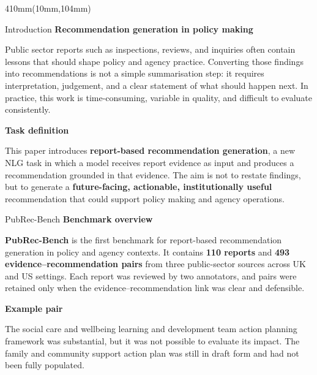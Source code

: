 \documentclass{article}
\newcommand{\SectionHeading}[1]{{\bfseries\fontsize{29}{33}\selectfont #1}\par\vspace{4mm}}
\newcommand{\BodyText}{\fontsize{24}{30}\selectfont\color{PosterText}}
\newcommand{\SmallBody}{\fontsize{21}{27}\selectfont\color{PosterText}}
\begin{document}
\begin{textblock*}{410mm}(10mm,104mm)
\begin{postersection}{Introduction}
\BodyText
\SectionHeading{Recommendation generation in policy making}
Public sector reports such as inspections, reviews, and inquiries often contain lessons that should shape policy and agency practice. Converting those findings into recommendations is not a simple summarisation step: it requires interpretation, judgement, and a clear statement of what should happen next. In practice, this work is time-consuming, variable in quality, and difficult to evaluate consistently.

\vspace{15mm}
\SectionHeading{Task definition}
This paper introduces \textbf{report-based recommendation generation}, a new NLG task in which a model receives report evidence as input and produces a recommendation grounded in that evidence. The aim is not to restate findings, but to generate a \textbf{future-facing, actionable, institutionally useful} recommendation that could support policy making and agency operations.

\vspace{6mm}
\begin{center}

\end{center}
\end{postersection}

\vspace{8mm}
\begin{postersection}{PubRec-Bench}
\BodyText
\SectionHeading{Benchmark overview}
\textbf{PubRec-Bench} is the first benchmark for report-based recommendation generation in policy and agency contexts. It contains \textbf{110 reports} and \textbf{493 evidence--recommendation pairs} from three public-sector sources across UK and US settings. Each report was reviewed by two annotators, and pairs were retained only when the evidence--recommendation link was clear and defensible.

\vspace{15mm}
\begin{minipage}[t]{0.50\linewidth}
\SectionHeading{Example pair}
\begin{tcolorbox}[colback=white,colframe=PosterHeader!20,arc=3mm,boxrule=0.8pt,left=3mm,right=3mm,top=2mm,bottom=2mm,title=Evidence,fonttitle=\bfseries\fontsize{20}{24}\selectfont]
\SmallBody
The social care and wellbeing learning and development team action planning framework was substantial, but it was not possible to evaluate its impact. The family and community support action plan was still in draft form and had not been fully populated.
\end{tcolorbox}


\end{minipage}
\end{postersection}
\end{textblock*}
\end{document}
